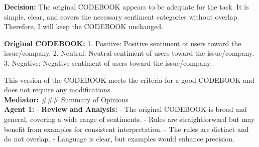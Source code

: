 \textbf{Decision:} The original CODEBOOK appears to be adequate for the
task. It is simple, clear, and covers the necessary sentiment categories
without overlap. Therefore, I will keep the CODEBOOK unchanged.

\textbf{Original CODEBOOK:} 1. Positive: Positive sentiment of users
toward the issue/company. 2. Neutral: Neutral sentiment of users toward
the issue/company. 3. Negative: Negative sentiment of users toward the
issue/company.

This version of the CODEBOOK meets the criteria for a good CODEBOOK and
does not require any modifications.\\

\textbf{Mediator:} \#\#\# Summary of Opinions\\

\textbf{Agent 1:} - \textbf{Review and Analysis:} - The original
CODEBOOK is broad and general, covering a wide range of sentiments. -
Rules are straightforward but may benefit from examples for consistent
interpretation. - The rules are distinct and do not overlap. - Language
is clear, but examples would enhance precision.


